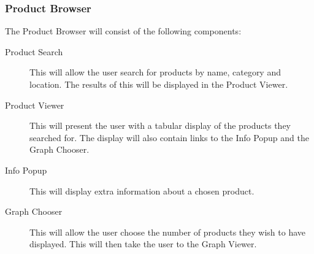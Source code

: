 \subsubsection{Product Browser}

The Product Browser will consist of the following components:
\begin{description}
\item[Product Search] This will allow the user search for products by name,
category and location. The results of this will be displayed in the Product Viewer.
\item[Product Viewer] This will present the user with a tabular display of the products they searched for.
 The display will also contain links to the Info Popup and the Graph Chooser.
\item[Info Popup] This will display extra information about a chosen product.
\item[Graph Chooser] This will allow the user choose the number of products they wish to have displayed. This will then take the user to the Graph Viewer.
\end{description} 


